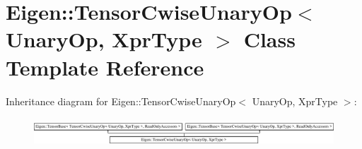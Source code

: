\hypertarget{class_eigen_1_1_tensor_cwise_unary_op}{}\section{Eigen\+:\+:Tensor\+Cwise\+Unary\+Op$<$ Unary\+Op, Xpr\+Type $>$ Class Template Reference}
\label{class_eigen_1_1_tensor_cwise_unary_op}
Inheritance diagram for Eigen\+:\+:Tensor\+Cwise\+Unary\+Op$<$ Unary\+Op, Xpr\+Type $>$\+:\begin{figure}[H]
\begin{center}
\leavevmode
\includegraphics[height=1.054614cm]{class_eigen_1_1_tensor_cwise_unary_op}
\end{center}
\end{figure}
